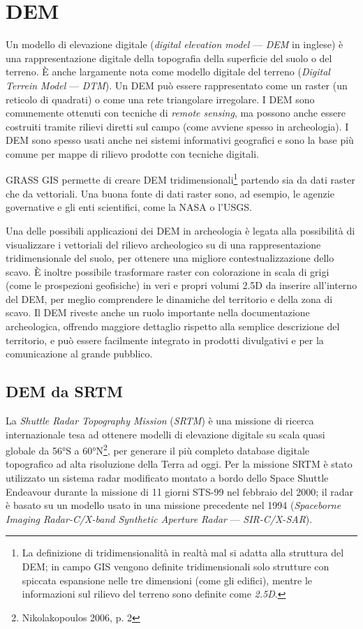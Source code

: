 \chapter{DEM}

Un modello di elevazione digitale (\emph{digital elevation model} --- \emph{DEM} in inglese) è una rappresentazione digitale della topografia della superficie del suolo o del terreno. È anche largamente nota come modello digitale del terreno (\emph{Digital Terrein Model} --- \emph{DTM}). Un DEM può essere rappresentato come un raster (un reticolo di quadrati) o come una rete triangolare irregolare. I DEM sono comunemente ottenuti con tecniche di \emph{remote sensing}, ma possono anche essere costruiti tramite rilievi diretti sul campo (come avviene spesso in archeologia). I DEM sono spesso usati anche nei sistemi informativi geografici e sono la base più comune per mappe di rilievo prodotte con tecniche digitali.

GRASS GIS permette di creare DEM tridimensionali\footnote{La definizione di tridimensionalità in realtà mal si adatta alla struttura del DEM; in campo GIS vengono definite tridimensionali solo strutture con spiccata espansione nelle tre dimensioni (come gli edifici), mentre le informazioni sul rilievo del terreno sono definite come \emph{2.5D}.} partendo sia da dati raster che da vettoriali. Una buona fonte di dati raster sono, ad esempio, le agenzie governative e gli enti scientifici, come la NASA o l'USGS.

Una delle possibili applicazioni dei DEM in archeologia è legata alla possibilità di visualizzare i vettoriali del rilievo archeologico su di una rappresentazione tridimensionale del suolo, per ottenere una migliore contestualizzazione dello scavo. È inoltre possibile trasformare raster con colorazione in scala di grigi (come le prospezioni geofisiche) in veri e propri volumi 2.5D da inserire all'interno del DEM, per meglio comprendere le dinamiche del territorio e della zona di scavo. Il DEM riveste anche un ruolo importante nella documentazione archeologica, offrendo maggiore dettaglio rispetto alla semplice descrizione del territorio, e può essere facilmente integrato in prodotti divulgativi e per la comunicazione al grande pubblico.


\section{DEM da SRTM}
	La \emph{Shuttle Radar Topography Mission} (\emph{SRTM}) è una missione di ricerca internazionale tesa ad ottenere modelli di elevazione digitale su scala quasi globale da 56\unit{\degree}S a 60\unit{\degree}N\footnote{Nikolakopoulos 2006, p. 2}, per generare il più completo database digitale topografico ad alta risoluzione della Terra ad oggi. Per la missione SRTM è stato utilizzato un sistema radar modificato montato a bordo dello Space Shuttle Endeavour durante la missione di 11 giorni STS-99 nel febbraio del 2000; il radar è basato su un modello usato in una missione precedente nel 1994 (\emph{Spaceborne Imaging Radar-C/X-band Synthetic Aperture Radar} --- \emph{SIR-C/X-SAR}).

